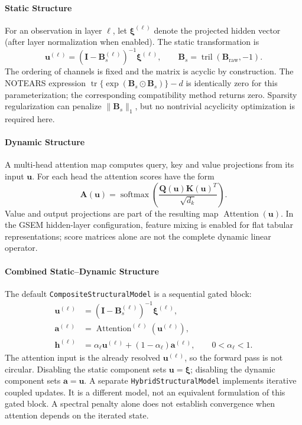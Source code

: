 \documentclass[12pt,a4paper]{article}
\begin{document}
\paragraph{Static Structure}
For an observation in layer $\ell$, let $\boldsymbol\xi^{(\ell)}$ denote the projected hidden vector (after layer normalization when enabled). The static transformation is
\begin{equation}
 \mathbf u^{(\ell)}=(\mathbf I-\mathbf B_s^{(\ell)})^{-1}\boldsymbol\xi^{(\ell)},
 \qquad \mathbf B_s=\operatorname{tril}(\mathbf B_{\mathrm{raw}},-1).
\end{equation}
The ordering of channels is fixed and the matrix is acyclic by construction. The NOTEARS expression $\operatorname{tr}\{\exp(\mathbf B_s\odot\mathbf B_s)\}-d$ is identically zero for this parameterization; the corresponding compatibility method returns zero. Sparsity regularization can penalize $\|\mathbf B_s\|_1$, but no nontrivial acyclicity optimization is required here.

\paragraph{Dynamic Structure}
A multi-head attention map computes query, key and value projections from its input $\mathbf u$. For each head the attention scores have the form
\begin{equation}
 \mathbf A(\mathbf u)=\operatorname{softmax}
 \left(\frac{\mathbf Q(\mathbf u)\mathbf K(\mathbf u)^T}{\sqrt{d_k}}\right).
\end{equation}
Value and output projections are part of the resulting map $\operatorname{Attention}(\mathbf u)$. In the GSEM hidden-layer configuration, feature mixing is enabled for flat tabular representations; score matrices alone are not the complete dynamic linear operator.

\paragraph{Combined Static--Dynamic Structure}
The default \texttt{CompositeStructuralModel} is a sequential gated block:
\begin{align}
 \mathbf u^{(\ell)}&=(\mathbf I-\mathbf B_s^{(\ell)})^{-1}\boldsymbol\xi^{(\ell)},\\
 \mathbf a^{(\ell)}&=\operatorname{Attention}^{(\ell)}(\mathbf u^{(\ell)}),\\
 \mathbf h^{(\ell)}&=\alpha_\ell\mathbf u^{(\ell)}
                    +(1-\alpha_\ell)\mathbf a^{(\ell)},\qquad 0<\alpha_\ell<1.
\end{align}
The attention input is the already resolved $\mathbf u^{(\ell)}$, so the forward pass is not circular. Disabling the static component sets $\mathbf u=\boldsymbol\xi$; disabling the dynamic component sets $\mathbf a=\mathbf u$. A separate \texttt{HybridStructuralModel} implements iterative coupled updates. It is a different model, not an equivalent formulation of this gated block. A spectral penalty alone does not establish convergence when attention depends on the iterated state.
\end{document}
